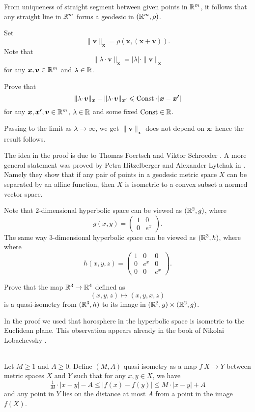 From uniqueness of straight segment between given points in $\mathbb{R}^m$,
it follows that any straight line in $\mathbb{R}^m$ forms a geodesic in $(\mathbb{R}^m,\rho)$.

Set 
\[\|\bm{v}\|_{\bm{x}}=\rho(\bm{x},(\bm{x}+\bm{v})).\]
Note that 
\[ \|\lambda\cdot\bm{v}\|_{\bm{x}}
=
|\lambda|\cdot\|\bm{v}\|_{\bm{x}}\]
for any $\bm{x},\bm{v}\in\mathbb{R}^m$ and $\lambda\in\mathbb{R}$.

Prove that 
\[
\|\lambda\cdot\bm{v}\|_{\bm{x}}
-
\|\lambda\cdot\bm{v}\|_{\bm{x}'}
\le 
\Const\cdot |\bm{x}-\bm{x'}|\]
for any $\bm{x},\bm{x'},\bm{v}\in\mathbb{R}^m$, 
$\lambda\in\mathbb{R}$
and some fixed $\operatorname{\rm Const}\in\mathbb{R}$.

Passing to the limit as $\lambda\to\infty$, 
we get
$\|\bm{v}\|_{\bm{x}}$ does not depend on $\bm{x}$;
hence the result follows.\qeds


The idea in the proof is due to Thomas Foertsch
and Viktor Schroeder \cite[see][]{foertsch-schroeder}.
A more general statement was proved by Petra Hitzelberger and Alexander Lytchak in \cite{hitzelberger-lytchak}.
Namely they show that 
if any pair of points in a geodesic metric space $X$ can be separated by an affine function,
then $X$ is isometric to a convex subset a normed vector space.


Note that $2$-dimensional hyperbolic space 
can be viewed as $(\mathbb{R}^2,g)$, where 
\[g(x,y)=\left(\begin{matrix}
     1&0
     \\
     0&e^{x}
    \end{matrix}\right).\]
The same way $3$-dimensional hyperbolic space 
can be viewed as $(\mathbb{R}^3,h)$, where 
where 
\[h(x,y,z)=\left(\begin{matrix}
     1&0&0
     \\
     0&e^{x}&0
     \\
     0&0&e^{x}
    \end{matrix}\right).\]

Prove that the map $\mathbb{R}^3\to \mathbb{R}^4$ defined as
$$(x,y,z)\mapsto (x,y,x,z)$$
is a quasi-isometry from $(\mathbb{R}^3,h)$ to its image in $(\mathbb{R}^2,g)\times (\mathbb{R}^2,g)$.\qeds


In the proof we used that horosphere in the hyperbolic space is isometric to the Euclidean plane.
This observation appears already in the book of Nikolai Lobachevsky \cite[see 34 in][]{lobachevsky}.

\\
Let $M\ge 1$ and $A\ge 0$.
Define $(M,A)$-quasi-isometry
as a map $f\:X\to Y$ between metric spaces $X$ and $Y$ such that for any $x,y\in X$,
 we have
\[\tfrac1M\cdot |x-y|-A\le |f(x)-f(y)|\le M\cdot |x-y|+A\]
and any point in $Y$ lies on the distance at most $A$ from a point in the image $f(X)$.

